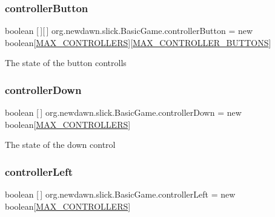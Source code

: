 \subsubsection{\texorpdfstring{controller\+Button}{controllerButton}}
{\footnotesize\ttfamily boolean \mbox{[}$\,$\mbox{]}\mbox{[}$\,$\mbox{]} org.\+newdawn.\+slick.\+Basic\+Game.\+controller\+Button = new boolean\mbox{[}\mbox{\hyperlink{classorg_1_1newdawn_1_1slick_1_1_basic_game_ae6a83ff9654d52fa13678d974cf80b27}{M\+A\+X\+\_\+\+C\+O\+N\+T\+R\+O\+L\+L\+E\+RS}}\mbox{]}\mbox{[}\mbox{\hyperlink{classorg_1_1newdawn_1_1slick_1_1_basic_game_a87e5dc92b0b1138bfa8d11d2f6c6ac70}{M\+A\+X\+\_\+\+C\+O\+N\+T\+R\+O\+L\+L\+E\+R\+\_\+\+B\+U\+T\+T\+O\+NS}}\mbox{]}\hspace{0.3cm}{\ttfamily [protected]}}

The state of the button controlls \mbox{\label{classorg_1_1newdawn_1_1slick_1_1_basic_game_a1e5447288fb667f4a688b930899379cb}} 
\subsubsection{\texorpdfstring{controller\+Down}{controllerDown}}
{\footnotesize\ttfamily boolean \mbox{[}$\,$\mbox{]} org.\+newdawn.\+slick.\+Basic\+Game.\+controller\+Down = new boolean\mbox{[}\mbox{\hyperlink{classorg_1_1newdawn_1_1slick_1_1_basic_game_ae6a83ff9654d52fa13678d974cf80b27}{M\+A\+X\+\_\+\+C\+O\+N\+T\+R\+O\+L\+L\+E\+RS}}\mbox{]}\hspace{0.3cm}{\ttfamily [protected]}}

The state of the down control \mbox{\label{classorg_1_1newdawn_1_1slick_1_1_basic_game_ab9942a3607c7c1bb9f68c7f49514edb6}} 
\subsubsection{\texorpdfstring{controller\+Left}{controllerLeft}}
{\footnotesize\ttfamily boolean \mbox{[}$\,$\mbox{]} org.\+newdawn.\+slick.\+Basic\+Game.\+controller\+Left = new boolean\mbox{[}\mbox{\hyperlink{classorg_1_1newdawn_1_1slick_1_1_basic_game_ae6a83ff9654d52fa13678d974cf80b27}{M\+A\+X\+\_\+\+C\+O\+N\+T\+R\+O\+L\+L\+E\+RS}}\mbox{]}\hspace{0.3cm}{\ttfamily [protected]}}

